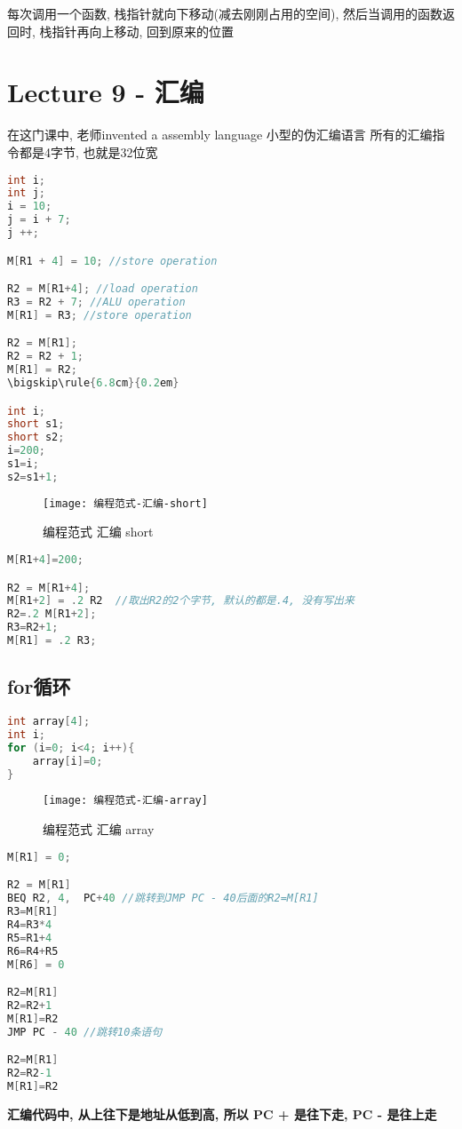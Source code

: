 \documentclass{article}
\begin{document}
每次调用一个函数, 栈指针就向下移动(减去刚刚占用的空间), 然后当调用的函数返回时, 栈指针再向上移动, 回到原来的位置

\section{Lecture 9 - 汇编}
在这门课中, 老师invented a assembly language
小型的伪汇编语言
所有的汇编指令都是4字节, 也就是32位宽

\begin{lstlisting}[language = C]
int i;
int j;
i = 10;
j = i + 7;
j ++;

M[R1 + 4] = 10; //store operation

R2 = M[R1+4]; //load operation
R3 = R2 + 7; //ALU operation
M[R1] = R3; //store operation

R2 = M[R1];
R2 = R2 + 1;
M[R1] = R2;
\bigskip\rule{6.8cm}{0.2em}

int i;
short s1;
short s2;
i=200;
s1=i;
s2=s1+1;
\end{lstlisting}
\begin{figure}[htbp]
	\centering
	\texttt{[image: 编程范式-汇编-short]}\\
	\caption{编程范式 汇编 short}\label{fig.编程范式.汇编.short}
\end{figure}


\begin{lstlisting}[language = C]
M[R1+4]=200;

R2 = M[R1+4];
M[R1+2] = .2 R2  //取出R2的2个字节, 默认的都是.4, 没有写出来
R2=.2 M[R1+2];
R3=R2+1;
M[R1] = .2 R3;
\end{lstlisting}

\subsection{for循环}
\begin{lstlisting}[language = C]
int array[4];
int i;
for (i=0; i<4; i++){
	array[i]=0;
}
\end{lstlisting}
\begin{figure}[htbp]
	\centering
	\texttt{[image: 编程范式-汇编-array]}\\
	\caption{编程范式 汇编 array}\label{fig.编程范式.汇编.array}
\end{figure}

\begin{lstlisting}[language = C]
M[R1] = 0;

R2 = M[R1]
BEQ R2, 4,  PC+40 //跳转到JMP PC - 40后面的R2=M[R1]
R3=M[R1]
R4=R3*4
R5=R1+4
R6=R4+R5
M[R6] = 0

R2=M[R1]
R2=R2+1
M[R1]=R2
JMP PC - 40 //跳转10条语句

R2=M[R1]
R2=R2-1
M[R1]=R2
\end{lstlisting}
\textbf{汇编代码中, 从上往下是地址从低到高, 所以 PC + 是往下走, PC - 是往上走}
\end{document}

